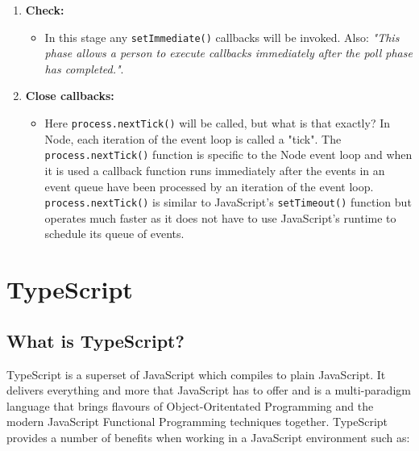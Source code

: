 \begin{enumerate}
\begin{itemize}
	\end{itemize}
\item \textbf{Check:}
	\begin{itemize}
	\item In this stage any \verb|setImmediate()| callbacks will be invoked. Also: \emph{"This phase allows a person to execute callbacks immediately after the poll phase has completed."}\cite{node}.
	\end{itemize}
\item \textbf{Close callbacks:}
	\begin{itemize}
	\item Here \verb|process.nextTick()| will be called, but what is that exactly? In Node, each iteration of the event loop is called a "tick". The  \verb|process.nextTick()| function is specific to the Node event loop and when it is used a callback function runs immediately after the events in an event queue have been processed by an iteration of the event loop.  \verb|process.nextTick()| is similar to JavaScript's \verb|setTimeout()| function but operates much faster as it does not have to use JavaScript's runtime to schedule its queue of events.
	\end{itemize}
\end{enumerate}

\section{TypeScript}
\subsection{What is TypeScript?}
TypeScript\cite{typescript} is a superset of JavaScript which compiles to plain JavaScript. It delivers everything and more that JavaScript has to offer and is a multi-paradigm language that brings flavours of Object-Oritentated Programming and the modern JavaScript Functional Programming techniques together. TypeScript provides a number of benefits when working in a JavaScript environment such as:

